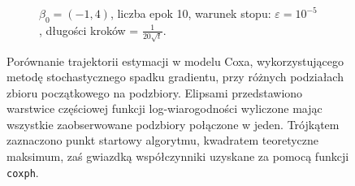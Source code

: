 \begin{figure}[hbt!]
\begin{center}
\begin{subfigure}[h!]{0.9\textwidth}
            \caption{$\beta_0=(-1,4)$, liczba epok 10, warunek stopu: $\varepsilon=10^{-5}$, długości kroków = $\frac{1}{20\sqrt{t}}$.}
   \end{subfigure}  
      \end{center}
  \caption[Porównanie estymacji w modelu Coxa metodą stochastycznego spadku gradientu dla różnych podziałów zbioru początkowego na podzbiory.]{\label{rysCox4}Porównanie trajektorii estymacji w modelu Coxa, wykorzystującego metodę stochastycznego spadku gradientu, przy różnych podziałach zbioru początkowego na podzbiory. Elipsami przedstawiono warstwice częściowej funkcji log-wiarogodności wyliczone mając wszystkie zaobserwowane podzbiory połączone w jeden. Trójkątem zaznaczono punkt startowy algorytmu, kwadratem teoretyczne maksimum, zaś gwiazdką współczynniki uzyskane za pomocą funkcji \texttt{coxph}.}
\end{figure}